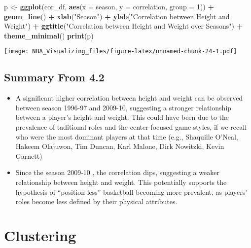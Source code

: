 \documentclass[
]{book}
\newenvironment{Shaded}{\begin{snugshade}}{\end{snugshade}}
\newcommand{\AttributeTok}[1]{\textcolor[rgb]{0.13,0.29,0.53}{#1}}
\newcommand{\DecValTok}[1]{\textcolor[rgb]{0.00,0.00,0.81}{#1}}
\newcommand{\FunctionTok}[1]{\textcolor[rgb]{0.13,0.29,0.53}{\textbf{#1}}}
\newcommand{\NormalTok}[1]{#1}
\newcommand{\OtherTok}[1]{\textcolor[rgb]{0.56,0.35,0.01}{#1}}
\newcommand{\SpecialCharTok}[1]{\textcolor[rgb]{0.81,0.36,0.00}{\textbf{#1}}}
\newcommand{\StringTok}[1]{\textcolor[rgb]{0.31,0.60,0.02}{#1}}
\providecommand{\tightlist}{%
  \setlength{\itemsep}{0pt}\setlength{\parskip}{0pt}}
\begin{document}
\begin{Shaded}
\begin{Highlighting}[]
\NormalTok{p }\OtherTok{\textless{}{-}} \FunctionTok{ggplot}\NormalTok{(cor\_df, }\FunctionTok{aes}\NormalTok{(}\AttributeTok{x =}\NormalTok{ season,}
    \AttributeTok{y =}\NormalTok{ correlation,}
    \AttributeTok{group =} \DecValTok{1}\NormalTok{)) }\SpecialCharTok{+} \FunctionTok{geom\_line}\NormalTok{() }\SpecialCharTok{+}
    \FunctionTok{xlab}\NormalTok{(}\StringTok{"Season"}\NormalTok{) }\SpecialCharTok{+}
    \FunctionTok{ylab}\NormalTok{(}\StringTok{"Correlation between Height and Weight"}\NormalTok{) }\SpecialCharTok{+}
    \FunctionTok{ggtitle}\NormalTok{(}\StringTok{"Correlation between Height and Weight over Seasons"}\NormalTok{) }\SpecialCharTok{+}
    \FunctionTok{theme\_minimal}\NormalTok{()}
\FunctionTok{print}\NormalTok{(p)}
\end{Highlighting}
\end{Shaded}

\texttt{[image: NBA\_Visualizing\_files/figure-latex/unnamed-chunk-24-1.pdf]}

\hypertarget{summary-from-4.2}{%
\section{Summary From 4.2}\label{summary-from-4.2}}

\begin{itemize}
\tightlist
\item
  A significant higher correlation between height and weight can be observed between season 1996-97 and 2009-10, suggesting a stronger relationship between a player's height and weight. This could have been due to the prevalence of taditional roles and the center-focused game styles, if we recall who were the most dominant players at that time (e.g., Shaquille O'Neal, Hakeem Olajuwon, Tim Duncan, Karl Malone, Dirk Nowitzki, Kevin Garnett)
\item
  Since the season 2009-10 , the correlation dips, suggesting a weaker relationship between height and weight. This potentially supports the hypothesis of ``position-less'' basketball becoming more prevalent, as players' roles become less defined by their physical attributes.
\end{itemize}

\hypertarget{clustering}{%
\chapter{Clustering}\label{clustering}}
\end{document}
